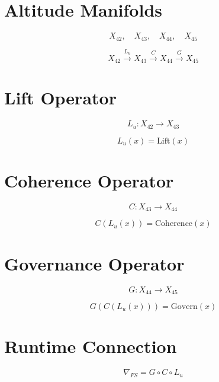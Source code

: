 
\section*{Altitude Manifolds}

\[
X_{42},\quad X_{43},\quad X_{44},\quad X_{45}
\]

\[
X_{42} \xrightarrow{L_u} X_{43} \xrightarrow{C} X_{44} \xrightarrow{G} X_{45}
\]


\section*{Lift Operator}

\[
L_u : X_{42} \to X_{43}
\]

\[
L_u(x) = \mathrm{Lift}(x)
\]


\section*{Coherence Operator}

\[
C : X_{43} \to X_{44}
\]

\[
C(L_u(x)) = \mathrm{Coherence}(x)
\]


\section*{Governance Operator}

\[
G : X_{44} \to X_{45}
\]

\[
G(C(L_u(x))) = \mathrm{Govern}(x)
\]


\section*{Runtime Connection}

\[
\nabla_{FS} = G \circ C \circ L_u
\]


